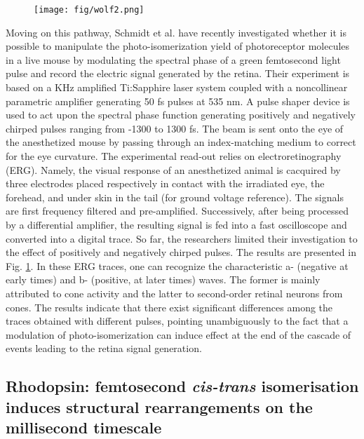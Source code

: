 \documentclass[journal=jacsat,manuscript=article]{achemso}
\begin{document}
\begin{figure}[h]
\texttt{[image: fig/wolf2.png]}
\caption{        }
\label{fig:wolf2}
\end{figure} 


Moving on this pathway, Schmidt et al. have recently investigated
whether it is possible to manipulate the photo-isomerization yield of
photoreceptor molecules in a live mouse by modulating the spectral
phase of a green femtosecond light pulse and record the electric
signal generated by the retina. Their experiment is based on a KHz
amplified Ti:Sapphire laser system coupled with a noncollinear
parametric amplifier generating 50 fs pulses at 535 nm. A pulse shaper
device is used to act upon the spectral phase function generating
positively and negatively chirped pulses ranging from -1300 to 1300
fs. The beam is sent onto the eye of the anesthetized mouse by passing
through an index-matching medium to correct for the eye curvature. The
experimental read-out relies on electroretinography (ERG). Namely, the
visual response of an anesthetized animal is cacquired by three
electrodes placed respectively in contact with the irradiated eye, the
forehead, and under skin in the tail (for ground voltage
reference). The signals are first frequency filtered and
pre-amplified. Successively, after being processed by a differential
amplifier, the resulting signal is fed into a fast oscilloscope and
converted into a digital trace. So far, the researchers limited their
investigation to the effect of positively and negatively chirped
pulses. The results are presented in Fig. \ref{fig:wolf2}. In these
ERG traces, one can recognize the characteristic a- (negative at early
times) and b- (positive, at later times) waves. The former is mainly
attributed to cone activity and the latter to second-order retinal
neurons from cones. The results indicate that there exist significant
differences among the traces obtained with different pulses, pointing
unambiguously to the fact that a modulation of photo-isomerization can
induce effect at the end of the cascade of events leading to the
retina signal generation.


\subsection{Rhodopsin: femtosecond \emph{cis-trans} isomerisation induces
  structural rearrangements on the millisecond timescale}
\end{document}
